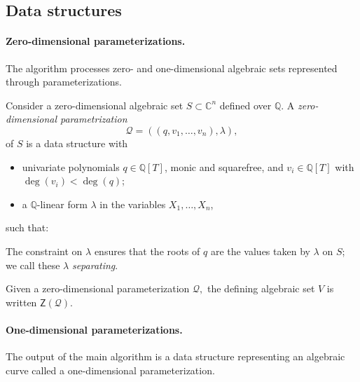 \documentclass[12pt]{article}
\def\scrQ{\ensuremath{\mathscr{Q}}}
\def\C{\mathbb{C}}
\def\Q{\mathbb{Q}}
\def\Zeroes{\mathsf{Z}}
\def\scrQ{\ensuremath{\mathscr{Q}}}
\def\C{\mathbb{C}}
\def\Q{\mathbb{Q}}
\begin{document}
 










\subsection{Data structures}
\paragraph*{Zero-dimensional parameterizations.}
The algorithm processes zero- and one-dimensional algebraic sets represented through parameterizations.


Consider a zero-dimensional algebraic set $S \subset \C^n$ defined over $\mathbb{Q}$. A \emph{zero-dimensional parametrization} 
\[
\scrQ = ((q, v_1, \ldots, v_n), \lambda),
\]
of $S$ is a data structure with
%
\begin{itemize}
    \item univariate polynomials $q \in \Q[T]$, monic and squarefree, and $v_i \in \Q[T]$ with $\deg(v_i) < \deg(q)$;
    \item a $\mathbb{Q}$-linear form $\lambda$ in the variables $ X_1, \dots, X_n$,
\end{itemize}
%
such that:

%
The constraint on $\lambda$ ensures that the roots of $q$ are the values taken by $\lambda$ on $S$; we call these $\lambda$ \textit{separating}.

%
Given a zero-dimensional parameterization $\scrQ,$ the defining algebraic set $V$ is written $\Zeroes(\scrQ).$ 






\paragraph*{One-dimensional parameterizations.}
The output of the main algorithm is a data structure representing an algebraic curve called a one-dimensional parameterization. 
\end{document}

